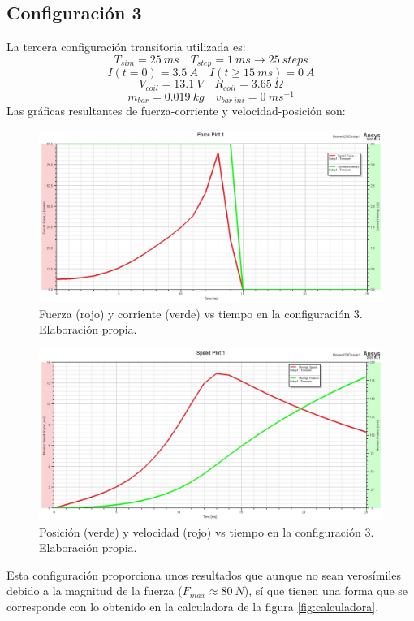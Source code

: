 \subsection*{Configuración 3}
La tercera configuración transitoria utilizada es:
\[
T_{sim}=25~ms \quad T_{step}=1~ms \to 25~steps
\]
\[
I(t=0)=3.5~A \quad I(t\geq 15~ms)=0~A
\]
\[
V_{coil}=13.1~V \quad R_{coil}=3.65~\Omega
\]
\[
m_{bar}=0.019~kg \quad v_{bar~ini}=0~ms^{-1}
\]
Las gráficas resultantes de fuerza-corriente y velocidad-posición son:
\begin{figure}[H]
    \centering
    \includegraphics[width=13cm]{FigurasMemoria/S3ForceCurrent.jpg}
    \caption{Fuerza (rojo) y corriente (verde) vs tiempo en la configuración 3. Elaboración propia.}
    \label{fig:S3ForceCurrent} %
\end{figure}
\begin{figure}[H]
    \centering
    \includegraphics[width=13cm]{FigurasMemoria/S3SpeedPos.jpg}
    \caption{Posición (verde) y velocidad (rojo) vs tiempo en la configuración 3. Elaboración propia.}
    \label{fig:S3SpeedPos} %
\end{figure}
Esta configuración proporciona unos resultados que aunque no sean verosímiles debido a la magnitud de la fuerza (\(F_{max}\approx 80~N\)), sí que tienen una forma que se corresponde con lo obtenido en la calculadora de la figura \ref{fig:calculadora}.